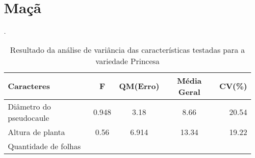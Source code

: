 \section{Maçã}
\begin{table}[!htb]
	\begin{center}
		\caption{Resultado da análise de variância das características testadas para a variedade Princesa}.
		\begin{tabular*}{\textwidth}{@{\extracolsep{\fill}}lcccr}
			\toprule
			\toprule
			\textbf{Caracteres} & \textbf{F}  & \textbf{QM(Erro)} & \textbf{Média Geral} &\textbf {CV(\%)} \\
			\hline
			Diâmetro do pseudocaule & 0.948 & 3.18 & 8.66 & 20.54\\ 
			Altura de planta 		& 0.56 & 6.914 & 13.34 & 19.22\\
			Quantidade de folhas 	&&&&\\
			\hline
			\hline
		\end{tabular*}
	\end{center}
\end{table}
